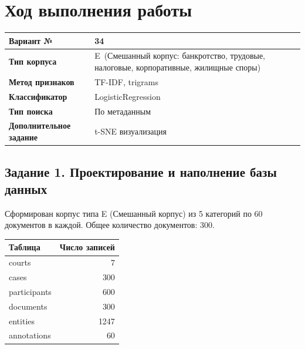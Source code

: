 \documentclass[a4paper,12pt]{article}
\newcommand{\VariantNum}{34}
\newcommand{\CorpusType}{E}
\newcommand{\FeatureMethod}{TF-IDF, trigrams}
\newcommand{\ClassifierName}{LogisticRegression}
\newcommand{\SearchType}{По метаданным}
\newcommand{\SpecTask}{t-SNE визуализация}
\begin{document}
\section{Ход выполнения работы}

\begin{center}
\begin{tabular}{|>{\bfseries\small}p{4.5cm}|p{7cm}|}
\hline
Вариант №               & \VariantNum      \\ \hline
Тип корпуса             & \CorpusType\ (Смешанный корпус: банкротство, трудовые, налоговые, корпоративные, жилищные споры)      \\ \hline
Метод признаков         & \FeatureMethod   \\ \hline
Классификатор           & \ClassifierName  \\ \hline
Тип поиска              & \SearchType      \\ \hline
Дополнительное задание  & \SpecTask        \\ \hline
\end{tabular}
\end{center}

\subsection{Задание 1. Проектирование и наполнение базы данных}

Сформирован корпус типа E (Смешанный корпус) из 5 категорий по 60 документов в каждой. Общее количество документов: 300.

\begin{infobox}
\begin{tabular}{|l|r|}
\hline
\textbf{Таблица} & \textbf{Число записей} \\ \hline
courts & 7 \\ \hline
cases & 300 \\ \hline
participants & 600 \\ \hline
documents & 300 \\ \hline
entities & 1247 \\ \hline
annotations & 60 \\ \hline
\end{tabular}
\end{infobox}
\end{document}
